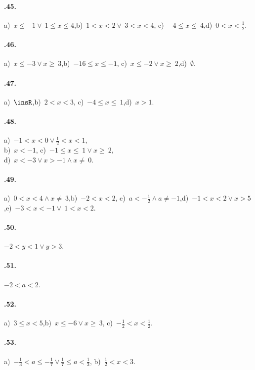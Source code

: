 \begin{multicols}{2}
\paragraph{\thechapter.45.} a)~$x\le -1\vee~1\le x\le4$,\quad b)~$1<x<2\vee~3<x<4$,\quad
c)~$-4\le x\le~4$,\quad d)~$0<x<\frac{1}{2}$.

\paragraph{\thechapter.46.} a)~$x\le -3\vee x\ge~3$,\quad b)~$-16\le x\le -1$,\quad
c)~$x\le -2\vee x\ge~2$,\quad d)~$\emptyset $.

\paragraph{\thechapter.47.} a)~$\insR$,\quad b)~$2<x<3$,\quad
c)~$-4\le x\le~1$,\quad d)~$x>1$.

\paragraph{\thechapter.48.} a)~$-1<x<0\vee \frac{1}{2}<x<1$,\quad \protect\\ b)~$x<-1$,\quad
c)~$-1\le x\le~1\vee x\ge~2$,\quad \protect\\ d)~$x<-3\vee x>-1\wedge x\neq~0$.

\paragraph{\thechapter.49.} a)~$0<x<4\wedge x\neq~3$,\quad b)~$-2<x<2$,\quad
c)~$a<-{\frac{1}{2}}\wedge a\neq -1$,\quad d)~$-1<x<2\vee x>5$,\quad e)~$-3<x<-1\vee~1<x<2$.

\paragraph{\thechapter.50.} $-2<y<1\vee y>3$.

\paragraph{\thechapter.51.} $-2<a<2$.

\paragraph{\thechapter.52.} a)~$3\le x<5$,\quad b)~$x\le -6\vee x\ge~3$,\quad
c)~$-{\frac{1}{2}}<x<\frac{1}{2}$.

\paragraph{\thechapter.53.} a)~$-{\frac{1}{3}}<a\le -{\frac{1}{7}}\vee \frac{1}{7}\le a<\frac{1}{3}$,\quad
b)~$\frac{1}{2}<x<3$.


\end{multicols}
